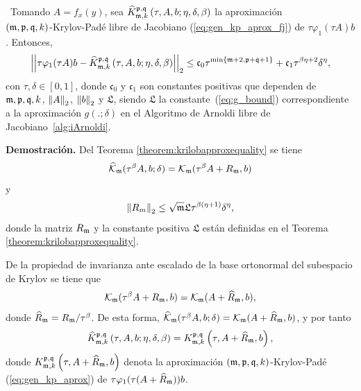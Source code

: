 \begin{theorem}\label{theorem:Krylov-fj-bound}
\cite{naranjo2023jacobian}~Tomando $A=f_x(y)$, sea $\widehat{K}_{\mathfrak{m},k}^{\mathfrak{p},\mathfrak{q}}\left(\tau, A , b ; \eta, \delta, \beta \right)$ la aproximación \\
	$(\mathfrak{m} , \mathfrak{p} ,\mathfrak{q} , k)$-Krylov-Padé libre de Jacobiano (\ref{eq:gen_kp_aprox_fj}) de $\tau \varphi_1(\tau A)b$. Entonces,
	\begin{equation}
		\left\lvert\left\lvert  \tau \varphi_1(\tau A)b -
		\widehat{K}_{\mf,k}^{\pf,\qf}\left( \tau, A , b ; \eta, \delta, \beta \right)\right\rvert\right\rvert_2%
		\leq \mathfrak{c}_0 \tau^{\min\{\mf+2,\pf+\qf+1\}} + \mathfrak{c}_1 \tau^{\beta\eta+2}\delta^{\eta},
	\end{equation}
	con $\tau,\delta \in [0,1]$, donde $\mathfrak{c}_0$ y $\mathfrak{c}_1$ son constantes positivas que dependen de $\mathfrak{m},\mathfrak{p},\mathfrak{q},k$, $\left\lVert A \right\rVert_2$, $\left\lVert b \right\rVert_2$ y $\mathfrak{L}$, siendo $\mathfrak{L}$ la constante~(\ref{eq:g_bound}) correspondiente a la aproximación $g(.;\delta)$ en el Algoritmo de Arnoldi libre de Jacobiano~\ref{alg:iArnoldi}.
\end{theorem}
\textbf{Demostración.} Del Teorema \ref{theorem:krilobapproxequality} se tiene
\[ \widehat{\mathcal{K}}_{\mathfrak{m}}(\tau^\beta A,b;\delta)=\mathcal{K}_{\mathfrak{m}}(\tau^\beta A+R_{\mathfrak{m}},b) \]
y
\begin{equation}
	\left\lVert R_m \right\rVert_2\leq \sqrt{\mathfrak{m}} \mathfrak{L} \tau^{\beta(\eta+1)}\delta^{\eta},  \label{eq:fjbound3}
\end{equation}
donde la matriz $R_{\mathfrak{m}}$ y la constante positiva $\mathfrak{L}$ están definidas en el Teorema \ref{theorem:krilobapproxequality}. 

De la propiedad de invarianza ante escalado de la base ortonormal del subespacio de Krylov se tiene que
\[ \mathcal{K}_{\mathfrak{m}}(\tau^\beta A+R_{\mathfrak{m}},b) = \mathcal{K}_{\mathfrak{m}}(A+\widehat{R}_{\mathfrak{m}},b), \]
donde $\widehat{R}_{\mathfrak{m}} = R_{\mathfrak{m}}/\tau^\beta$. De esta forma, $\widehat{\mathcal{K}}_{\mathfrak{m}}(\tau^\beta A,b;\delta)=\mathcal{K}_{\mathfrak{m}}(A+\widehat{R}_{\mathfrak{m}},b)$, y por tanto
\begin{equation}
	\widehat{K}_{\mathfrak{m},k}^{\mathfrak{p},\mathfrak{q}}\left( \tau, A , b; \eta, \delta, \beta \right) = K_{\mathfrak{m},k}^{\mathfrak{p},\mathfrak{q}}\left( \tau, A+\widehat{R}_{\mathfrak{m}} , b \right), \label{identidad}
\end{equation}
donde $K_{\mathfrak{m},k}^{\mathfrak{p},\mathfrak{q}}\left( \tau, A+\widehat{R}_{\mathfrak{m}} , b \right)$ denota la aproximación $(\mathfrak{m} , \mathfrak{p} ,\mathfrak{q} , k)$-Krylov-Padé (\ref{eq:gen_kp_aprox}) de $\tau \varphi_1(\tau (A+\widehat{R}_{\mathfrak{m}}))b$. 


